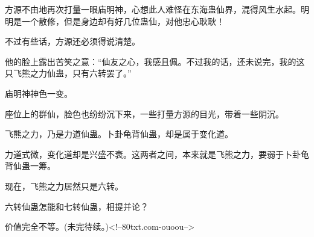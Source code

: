 \begin{this_body}
方源不由地再次打量一眼庙明神，心想此人难怪在东海蛊仙界，混得风生水起。明明是一个散修，但是身边却有好几位蛊仙，对他忠心耿耿！

不过有些话，方源还必须得说清楚。

他的脸上露出苦笑之意：“仙友之心，我感且佩。不过我的话，还未说完，我的这只飞熊之力仙蛊，只有六转罢了。”

庙明神神色一变。

座位上的群仙，脸色也纷纷沉下来，一些打量方源的目光，带着一些阴沉。

飞熊之力，乃是力道仙蛊。卜卦龟背仙蛊，却是属于变化道。

力道式微，变化道却是兴盛不衰。这两者之间，本来就是飞熊之力，要弱于卜卦龟背仙蛊一筹。

现在，飞熊之力居然只是六转。

六转仙蛊怎能和七转仙蛊，相提并论？

价值完全不等。(未完待续。)<!--80txt.com-ouoou-->

\end{this_body}

